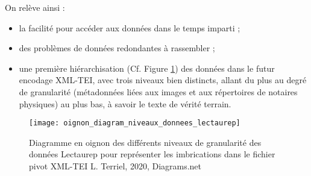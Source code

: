 On relève ainsi : 
\begin{itemize}
    \item la facilité pour accéder aux données dans le temps imparti ;
    \item des problèmes de données redondantes à rassembler ;
    \item une première hiérarchisation (Cf. Figure \ref{fig:oignon_diagram_niveaux_donnees_lectaurep}) des données dans le futur encodage XML-TEI, avec trois niveaux bien distincts, allant du plus au degré de granularité (métadonnées liées aux images et aux répertoires de notaires physiques) au plus bas, à savoir le texte de vérité terrain.
\end{itemize}
\begin{figure}
    \centering
    \centerline{\texttt{[image: oignon\_diagram\_niveaux\_donnees\_lectaurep]}}
    \caption{Diagramme en oignon des différents niveaux de granularité des données Lectaurep pour représenter les imbrications dans le fichier pivot XML-TEI \textcopyright L. Terriel, 2020, Diagrams.net}
    \label{fig:oignon_diagram_niveaux_donnees_lectaurep}
\end{figure}
\newpage
